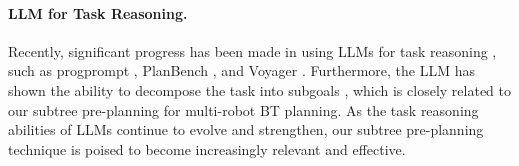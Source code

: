 \paragraph{LLM for Task Reasoning.} Recently, significant progress has been made in using LLMs for task reasoning \cite{song2023llmplanner,liu2023llm,ahn2022can,chen2023robogpt}, such as progprompt \cite{singh2022progprompt}, PlanBench \cite{valmeekam2023planbench}, and Voyager \cite{wang2023voyager}. Furthermore, the LLM has shown the ability to decompose the task into subgoals \cite{gao2024dagplan,singh2024twostep}, which is closely related to our subtree pre-planning for multi-robot BT planning. As the task reasoning abilities of LLMs continue to evolve and strengthen, our subtree pre-planning technique is poised to become increasingly relevant and effective.
